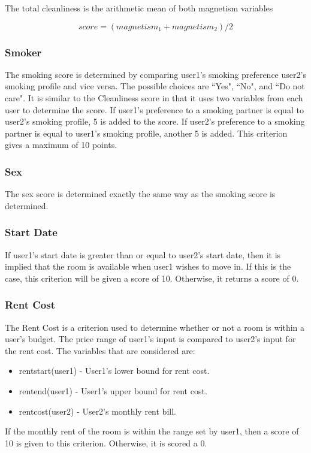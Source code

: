 \documentclass[journal]{IEEEtran}
\begin{document}
        The total cleanliness is the arithmetic mean of both magnetism variables

        $$score = (magnetism_1+magnetism_2)/2$$

    \subsubsection{Smoker}
        The smoking score is determined by comparing user1's smoking preference user2's smoking profile and vice versa.
        The possible choices are ``Yes", ``No", and ``Do not care". It is similar to the Cleanliness score in that it
        uses two variables from each user to determine the score. If user1's preference to a smoking partner is equal
        to user2's smoking profile, 5 is added to the score. If user2's preference to a smoking partner is equal to
        user1's smoking profile, another 5 is added. This criterion gives a maximum of 10 points.

    \subsubsection{Sex}
        The sex score is determined exactly the same way as the smoking score is determined.

    \subsubsection{Start Date}
        If user1's start date is greater than or equal to user2's start date, then it is implied that the room is
        available when user1 wishes to move in. If this is the case, this criterion will be given a score of 10.
        Otherwise, it returns a score of 0.

    \subsubsection{Rent Cost}
        The Rent Cost is a criterion used to determine whether or not a room is within a user's budget.
        The price range of user1's input is compared to user2's input for the rent cost. The variables that are
        considered are:
        \begin{itemize}
            \item rent\textunderscore start(user1) - User1's lower bound for rent cost.
            \item rent\textunderscore end(user1) - User1's upper bound for rent cost.
            \item rent\textunderscore cost(user2) - User2's monthly rent bill.
        \end{itemize}
        If the monthly rent of the room is within the range set by user1, then a score of 10 is given to this criterion.
        Otherwise, it is scored a 0.
\end{document}
